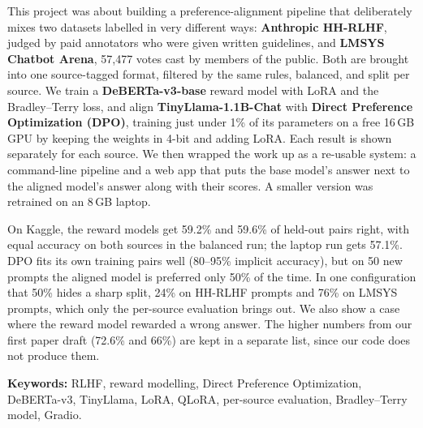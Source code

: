 \documentclass[a4paper,12pt,oneside]{report}
\begin{document}
This project was about building a preference-alignment pipeline that deliberately mixes two datasets labelled in very different ways: \textbf{Anthropic HH-RLHF}, judged by paid annotators who were given written guidelines, and \textbf{LMSYS Chatbot Arena}, 57,477 votes cast by members of the public. Both are brought into one source-tagged format, filtered by the same rules, balanced, and split per source. We train a \textbf{DeBERTa-v3-base} reward model with LoRA and the Bradley--Terry loss, and align \textbf{TinyLlama-1.1B-Chat} with \textbf{Direct Preference Optimization (DPO)}, training just under 1\% of its parameters on a free 16\,GB GPU by keeping the weights in 4-bit and adding LoRA. Each result is shown separately for each source. We then wrapped the work up as a re-usable system: a command-line pipeline and a web app that puts the base model's answer next to the aligned model's answer along with their scores. A smaller version was retrained on an 8\,GB laptop.

On Kaggle, the reward models get 59.2\% and 59.6\% of held-out pairs right, with equal accuracy on both sources in the balanced run; the laptop run gets 57.1\%. DPO fits its own training pairs well (80--95\% implicit accuracy), but on 50 new prompts the aligned model is preferred only 50\% of the time. In one configuration that 50\% hides a sharp split, 24\% on HH-RLHF prompts and 76\% on LMSYS prompts, which only the per-source evaluation brings out. We also show a case where the reward model rewarded a wrong answer. The higher numbers from our first paper draft (72.6\% and 66\%) are kept in a separate list, since our code does not produce them.

\vspace{6pt}\noindent\textbf{Keywords:} RLHF, reward modelling, Direct Preference Optimization, DeBERTa-v3, TinyLlama, LoRA, QLoRA, per-source evaluation, Bradley--Terry model, Gradio.

\pagestyle{plain}
\tableofcontents
{}
\listoffigures
{}
\listoftables
{}
\lstlistoflistings
\end{document}
